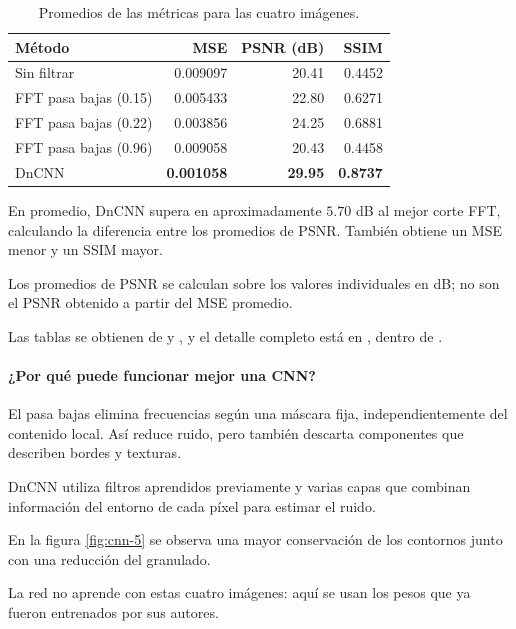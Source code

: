 \documentclass[11pt]{article}
\begin{document}
\begin{table}[H]
\centering

\caption{Promedios de las métricas para las cuatro imágenes.}
\label{tab:cnn-promedios}

\begin{tabular}{lrrr}
\hline
\rowcolor{pastelblue}
Método & MSE & PSNR (dB) & SSIM\\
\hline
Sin filtrar
    & 0.009097 & 20.41 & 0.4452\\
FFT pasa bajas (0.15)
    & 0.005433 & 22.80 & 0.6271\\
FFT pasa bajas (0.22)
    & 0.003856 & 24.25 & 0.6881\\
FFT pasa bajas (0.96)
    & 0.009058 & 20.43 & 0.4458\\
DnCNN
    & \textbf{0.001058}
    & \textbf{29.95}
    & \textbf{0.8737}\\
\hline
\end{tabular}
\end{table}

En promedio, DnCNN supera en aproximadamente $5.70$ dB al
mejor corte FFT, calculando la diferencia entre los
promedios de PSNR. También obtiene un MSE menor y un
SSIM mayor.

Los promedios de PSNR se calculan sobre los valores
individuales en dB; no son el PSNR obtenido a partir del
MSE promedio.

Las tablas se obtienen de  y
, y el detalle completo está en
, dentro de
.

\paragraph{¿Por qué puede funcionar mejor una CNN?}

El pasa bajas elimina frecuencias según una máscara fija,
independientemente del contenido local. Así reduce ruido,
pero también descarta componentes que describen bordes y
texturas.

DnCNN utiliza filtros aprendidos previamente y varias capas
que combinan información del entorno de cada píxel para
estimar el ruido.

En la figura \ref{fig:cnn-5} se observa una mayor
conservación de los contornos junto con una reducción del
granulado.

La red no aprende con estas cuatro imágenes: aquí se usan
los pesos que ya fueron entrenados por sus autores.
\end{document}
